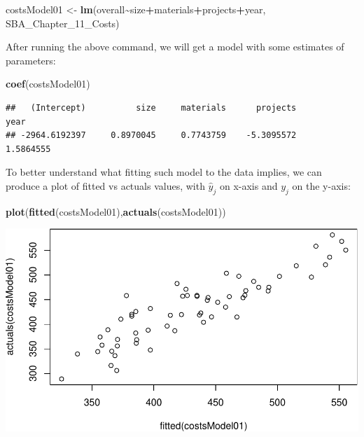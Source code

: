\documentclass[
]{book}
\newenvironment{Shaded}{\begin{snugshade}}{\end{snugshade}}
\newcommand{\FunctionTok}[1]{\textcolor[rgb]{0.13,0.29,0.53}{\textbf{#1}}}
\newcommand{\NormalTok}[1]{#1}
\newcommand{\OtherTok}[1]{\textcolor[rgb]{0.56,0.35,0.01}{#1}}
\newcommand{\SpecialCharTok}[1]{\textcolor[rgb]{0.81,0.36,0.00}{\textbf{#1}}}
\theoremstyle{definition}
\theoremstyle{definition}
\theoremstyle{definition}
\theoremstyle{definition}
\theoremstyle{remark}
\begin{document}
\begin{Shaded}
\begin{Highlighting}[]
\NormalTok{costsModel01 }\OtherTok{\textless{}{-}} \FunctionTok{lm}\NormalTok{(overall}\SpecialCharTok{\textasciitilde{}}\NormalTok{size}\SpecialCharTok{+}\NormalTok{materials}\SpecialCharTok{+}\NormalTok{projects}\SpecialCharTok{+}\NormalTok{year, SBA\_Chapter\_11\_Costs)}
\end{Highlighting}
\end{Shaded}

After running the above command, we will get a model with some estimates of parameters:

\begin{Shaded}
\begin{Highlighting}[]
\FunctionTok{coef}\NormalTok{(costsModel01)}
\end{Highlighting}
\end{Shaded}

\begin{verbatim}
##   (Intercept)          size     materials      projects          year 
## -2964.6192397     0.8970045     0.7743759    -5.3095572     1.5864555
\end{verbatim}

To better understand what fitting such model to the data implies, we can produce a plot of fitted vs actuals values, with \(\hat{y}_j\) on x-axis and \(y_j\) on the y-axis:

\begin{Shaded}
\begin{Highlighting}[]
\FunctionTok{plot}\NormalTok{(}\FunctionTok{fitted}\NormalTok{(costsModel01),}\FunctionTok{actuals}\NormalTok{(costsModel01))}
\end{Highlighting}
\end{Shaded}

\includegraphics{Svetunkov---Statistics-for-Business-Analytics_files/figure-latex/unnamed-chunk-72-1.pdf}
\end{document}
